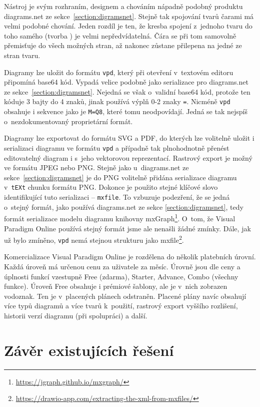 Nástroj je svým rozhraním, designem a chováním nápadně podobný produktu diagrams.net ze sekce~\ref{section:digramsnet}.
Stejně tak spojování tvarů čarami má velmi podobné chování.
Jeden rozdíl je ten, že kresba spojení z~jednoho tvaru do toho samého (tvorba ) je velmi nepředvídatelná.
Čára se při tom samovolně přemisťuje do všech možných stran, až nakonec zůstane přilepena na jedné ze stran tvaru.

Diagramy lze uložit do formátu \texttt{vpd}, který při otevření v~textovém editoru připomíná base64 kód.
Vypadá velice podobně jako serializace pro diagrams.net ze sekce~\ref{section:digramsnet}.
Nejedná se však o~validní base64 kód, protože ten kóduje 3 bajty do 4 znaků, jinak používá výplň 0-2 znaky \texttt{=}.
Nicméně \texttt{vpd} obsahuje i sekvence jako je \texttt{M=Q8}, které tomu neodpovídají.
Jedná se tak nejspíš o~nezdokumentovaný proprietární formát.

Diagramy lze exportovat do formátu SVG a PDF, do kterých lze volitelně uložit i serializaci diagramu ve formátu \texttt{vpd} a případně tak plnohodnotně přenést editovatelný diagram i s~jeho vektorovou reprezentací.
Rastrový export je možný ve formátu JPEG nebo PNG.
Stejně jako u~diagrams.net ze sekce~\ref{section:digramsnet} je do PNG volitelně přidána serializace diagramu v~\texttt{tEXt} chunku formátu PNG.
Dokonce je použito stejné klíčové slovo identifikující tuto serializaci -- \texttt{mxfile}.
To vzbuzuje podezření, že se jedná o~stejný formát, jako používá diagrams.net ze sekce \ref{section:digramsnet}, tedy formát serializace modelu diagramu knihovny mxGraph\footnote{\url{https://jgraph.github.io/mxgraph/}}.
O~tom, že Visual Paradigm Online používá stejný formát jsme ale nenašli žádné zmínky.
Dále, jak už bylo zmíněno, \texttt{vpd} nemá stejnou strukturu jako mxfile\footnote{\url{https://drawio-app.com/extracting-the-xml-from-mxfiles/}}.

Komercializace Visual Paradigm Online je rozdělena do několik platebních úrovní.
Každá úroveň má určenou cenu za uživatele za měsíc.
Úrovně jsou dle ceny a úplnosti funkcí vzestupně Free (zdarma), Starter, Advance, Combo (všechny funkce).
Úroveň Free obsahuje i prémiové šablony, ale je v~nich zobrazen vodoznak.
Ten je v~placených plánech odstraněn.
Placené plány navíc obsahují více typů diagramů a více tvarů k~použití, rastrový export vyššího rozlišení, historii verzí diagramu (při spolupráci) a další.

\section{Závěr existujících řešení}

